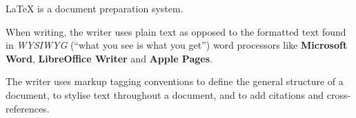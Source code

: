 \documentclass{article}
\begin{document}
\LaTeX{} is a document preparation system.

{\adventor When writing, the writer uses plain text as opposed to the formatted text found in
  \textit{WYSIWYG} (``what you see is what you get'') word processors like \textbf{Microsoft Word},
  \textbf{LibreOffice Writer} and \textbf{Apple Pages}.}

{The writer uses markup tagging conventions to define the general structure
  of a document, to stylise text throughout a document, and to add citations and cross-references.}
\end{document}
